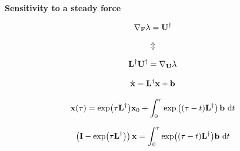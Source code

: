 \documentclass[aspectratio=169, usenames, dvipsnames]{beamer}
\begin{document}
\begin{frame}
  \vfill
  \centering
  \textbf{Sensitivity to a steady force}

  {
    \Large
    \[
      \nabla_{\vb{F}} \lambda = \vb{U}^{\dagger}
    \]

    \[
      \Updownarrow
    \]

    \[
      \vb{L}^{\dagger} \vb{U}^{\dagger} = \nabla_{\vb{U}} \lambda
    \]
  }
  \vfill
\end{frame}

\begin{frame}
  \vfill
  {
    \Large
    \[
      \dot{\vb{x}} = \vb{L}^{\dagger} \vb{x} + \vb{b}
    \]
  }
  \vfill
\end{frame}

\begin{frame}
  \vfill
  {
    \Large
    \[
      \vb{x}(\tau) = \exp(\tau \vb{L}^{\dagger}) \vb{x}_0 + \int_{0}^\tau \exp \left( (\tau - t) \vb{L}^{\dagger} \right) \vb{b} \ \dd t
    \]
  }
  \vfill
\end{frame}

\begin{frame}
  \vfill
  {
    \Large
    \[
      \left( \vb{I} - \exp(\tau \vb{L}^{\dagger}) \right) \vb{x} = \int_{0}^\tau \exp((\tau-t) \vb{L}^{\dagger}) \vb{b} \ \dd t
    \]
  }
  \vfill
\end{frame}
\end{document}
